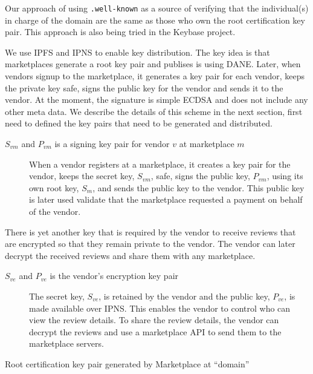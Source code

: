 \documentclass[a4paper]{article}
\begin{document}
Our approach of using \texttt{.well-known} as a source of verifying
that the individual(s) in charge of the domain are the same as those
who own the root certification key pair. This approach is also being
tried in the Keybase project\cite{keybase}.

We use IPFS and IPNS to enable key distribution. The key idea is that
marketplaces generate a root key pair and publises is using
DANE. Later, when vendors signup to the marketplace, it generates a
key pair for each vendor, keeps the private key safe, signs the public
key for the vendor and sends it to the vendor. At the moment, the
signature is simple ECDSA and does not include any other meta data. We
describe the details of this scheme in the next section, first need to
defined the key pairs that need to be generated and distributed.

\begin{description}
  
\item[$S_{vm}$ and $P_{vm}$ is a signing key pair for vendor $v$ at
  marketplace $m$] When a vendor registers at a marketplace, it
  creates a key pair for the vendor, keeps the secret key, $S_{vm}$,
  safe, signs the public key, $P_{vm}$, using its own root key,
  $S_{m}$, and sends the public key to the vendor. This public key is
  later used validate that the marketplace requested a payment on
  behalf of the vendor.

\end{description}

There is yet another key that is required by the vendor to receive
reviews that are encrypted so that they remain private to the
vendor. The vendor can later decrypt the received reviews and share
them with any marketplace.

\begin{description}
  
\item[$S_{ve}$ and $P_{ve}$ is the vendor's encryption key pair] The
  secret key, $S_{ve}$, is retained by the vendor and the public key,
  $P_{ve}$, is made available over IPNS\cite{ipfs}. This enables the
  vendor to control who can view the review details. To share the
  review details, the vendor can decrypt the reviews and use a
  marketplace API to send them to the marketplace servers.
  
\end{description}

\begin{algorithm}
  \caption{Root certification key pair generated by Marketplace at ``domain''}\label{algo:marketplace-root-key-generation}
  \begin{algorithmic}
  \end{algorithmic}    
\end{algorithm}
\end{document}
